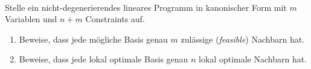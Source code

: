 \documentclass{uebung_cs}
\begin{document}
\begin{aufgabe}\
%
%
	
	Stelle ein nicht-degenerierendes lineares Programm in kanonischer Form mit $m$ Variablen und $n + m$ Constraints auf.
	\begin{enumerate}
		\item Beweise, dass jede mögliche Basis genau $m$ zulässige (\textit{feasible}) Nachbarn hat.
		\item Beweise, dass jede lokal optimale Basis genau $n$ lokal optimale Nachbarn hat.
	\end{enumerate}
\end{aufgabe}
\end{document}
